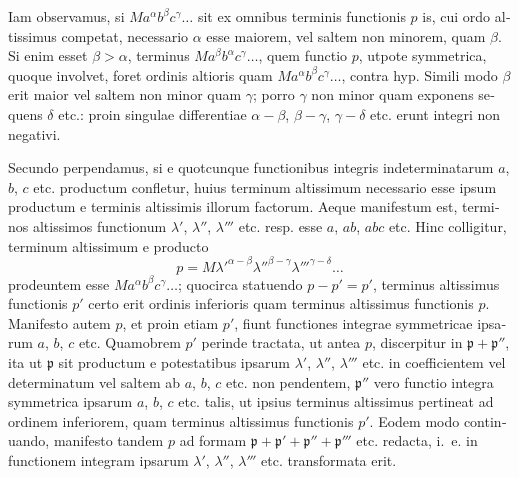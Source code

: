\documentclass[12pt,a4paper]{article}
\begin{document}
\begin{otherlanguage}{latin}
Iam observamus, si $Ma^{\alpha}b^{\beta}c^{\gamma}\ldots$ sit ex omnibus terminis functionis $p$ is, cui ordo altissimus competat, necessario $\alpha$ esse maiorem, vel saltem non minorem, quam $\beta$. Si enim esset $\beta>\alpha$, terminus $Ma^{\beta}b^{\alpha}c^{\gamma}\ldots$, quem functio $p$, utpote symmetrica, quoque involvet, foret ordinis altioris quam $Ma^{\alpha}b^{\beta}c^{\gamma}\ldots$, contra hyp. Simili modo $\beta$ erit maior vel saltem non minor quam $\gamma$; porro $\gamma$ non minor quam exponens sequens $\delta$ etc.: proin singulae differentiae $\alpha-\beta$, $\beta-\gamma$, $\gamma-\delta$ etc. erunt integri non negativi.

Secundo perpendamus, si e quotcunque functionibus integris indeterminatarum $a$, $b$, $c$ etc. productum confletur, huius terminum altissimum necessario esse ipsum productum e terminis altissimis illorum factorum. Aeque manifestum est, terminos altissimos functionum $\lambda'$, $\lambda''$, $\lambda'''$ etc. resp. esse $a$, $ab$, $abc$ etc. Hinc colligitur, terminum altissimum e producto
\[p=M\lambda'^{\alpha-\beta}\lambda''^{\beta-\gamma}\lambda'''^{\gamma-\delta}\ldots\]
prodeuntem esse $Ma^{\alpha}b^{\beta}c^{\gamma}\ldots$; quocirca statuendo $p-p'=p'$, terminus altissimus functionis $p'$ certo erit ordinis inferioris quam terminus altissimus functionis $p$. Manifesto autem $p$, et proin etiam $p'$, fiunt functiones integrae symmetricae ipsarum $a$, $b$, $c$ etc. Quamobrem $p'$ perinde tractata, ut antea $p$, discerpitur in $\mathfrak{p}+\mathfrak{p}''$, ita ut $\mathfrak{p}$ sit productum e potestatibus ipsarum $\lambda'$, $\lambda''$, $\lambda'''$ etc. in coefficientem vel determinatum vel saltem ab $a$, $b$, $c$ etc. non pendentem, $\mathfrak{p}''$ vero functio integra symmetrica ipsarum $a$, $b$, $c$ etc. talis, ut ipsius terminus altissimus pertineat ad ordinem inferiorem, quam terminus altissimus functionis $p'$. Eodem modo continuando, manifesto tandem $p$ ad formam $\mathfrak{p}+\mathfrak{p}'+\mathfrak{p}''+\mathfrak{p}'''$ etc. redacta, i.~e. in functionem integram ipsarum $\lambda'$, $\lambda''$, $\lambda'''$ etc. transformata erit.


\end{otherlanguage}
\end{document}
